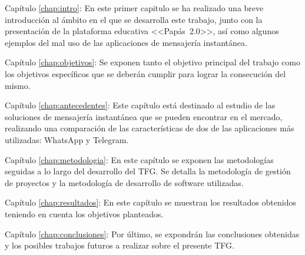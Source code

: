 \begin{definitionlist}	
	\item[Capítulo \ref{chap:intro}: \nameref{chap:intro}]
	En este primer capitulo se ha realizado una breve introducción al ámbito en el que se desarrolla este trabajo, junto con la presentación de la plataforma educativa \mbox{<<Papás 2.0>>}, así como algunos ejemplos del mal uso de las aplicaciones de mensajería instantánea.
	
	\item[Capítulo \ref{chap:objetivos}: \nameref{chap:objetivos}]
	Se exponen tanto el objetivo principal del trabajo como los objetivos específicos que se deberán cumplir para lograr la consecución del mismo.
	
	\item[Capítulo \ref{chap:antecedentes}: \nameref{chap:antecedentes}]
	Este capítulo está destinado al estudio de las soluciones de mensajería instantánea que se pueden encontrar en el mercado, realizando una comparación de las características de dos de las aplicaciones más utilizadas: WhatsApp y Telegram.
	
	\item[Capítulo \ref{chap:metodologia}: \nameref{chap:metodologia}]
	En este capítulo se exponen las metodologías seguidas a lo largo del desarrollo del \acs{TFG}. Se detalla la metodología de gestión de proyectos y la metodología de desarrollo de software utilizadas.
	
	\item[Capítulo \ref{chap:resultados}: \nameref{chap:resultados}]
	En este capítulo se muestran los resultados obtenidos teniendo en cuenta los objetivos planteados.
	
	\item[Capítulo \ref{chap:conclusiones}: \nameref{chap:conclusiones}]
	Por último, se expondrán las conclusiones obtenidas y los posibles trabajos futuros a realizar sobre el presente \acs{TFG}.
\end{definitionlist}

